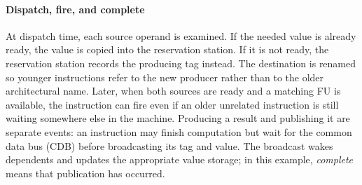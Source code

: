 \paragraph{Dispatch, fire, and complete}\label{par:ilp-tomasulo-flow}
At dispatch time, each source operand is examined.
If the needed value is already ready, the value is copied into the reservation station.
If it is not ready, the reservation station records the producing tag instead.
The destination is renamed so younger instructions refer to the new producer rather than to the older architectural name.
Later, when both sources are ready and a matching FU is available, the instruction can fire even if an older unrelated instruction is still waiting somewhere else in the machine.
Producing a result and publishing it are separate events: an instruction may finish computation but wait for the common data bus (CDB) before broadcasting its tag and value.
The broadcast wakes dependents and updates the appropriate value storage; in this example, \emph{complete} means that publication has occurred.

